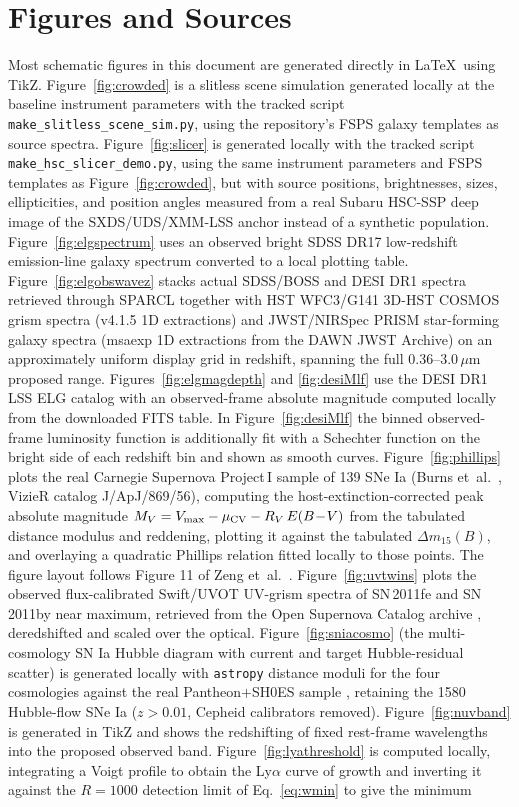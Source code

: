 \documentclass[10pt,onecolumn]{article}
\begin{document}
\section*{Figures and Sources}
Most schematic figures in this document are generated directly in \LaTeX\ using TikZ. Figure~\ref{fig:crowded} is a slitless scene simulation generated locally at the baseline instrument parameters with the tracked script \texttt{make\_slitless\_scene\_sim.py}, using the repository's FSPS galaxy templates as source spectra. Figure~\ref{fig:slicer} is generated locally with the tracked script \texttt{make\_hsc\_slicer\_demo.py}, using the same instrument parameters and FSPS templates as Figure~\ref{fig:crowded}, but with source positions, brightnesses, sizes, ellipticities, and position angles measured from a real Subaru HSC-SSP deep image of the SXDS/UDS/XMM-LSS anchor \cite{aihara2018} instead of a synthetic population. Figure~\ref{fig:elgspectrum} uses an observed bright SDSS DR17 low-redshift emission-line galaxy spectrum converted to a local plotting table. Figure~\ref{fig:elgobswavez} stacks actual SDSS/BOSS and DESI DR1 spectra retrieved through SPARCL together with HST WFC3/G141 3D-HST COSMOS grism spectra (v4.1.5 1D extractions) and JWST/NIRSpec PRISM star-forming galaxy spectra (msaexp 1D extractions from the DAWN JWST Archive) on an approximately uniform display grid in redshift, spanning the full $0.36$--$3.0\,\mu$m proposed range. Figures~\ref{fig:elgmagdepth} and \ref{fig:desiMlf} use the DESI DR1 LSS ELG catalog with an observed-frame absolute magnitude computed locally from the downloaded FITS table. In Figure~\ref{fig:desiMlf} the binned observed-frame luminosity function is additionally fit with a Schechter function on the bright side of each redshift bin and shown as smooth curves. Figure~\ref{fig:phillips} plots the real Carnegie Supernova Project\,I sample of 139 SNe Ia (Burns et~al.\ \cite{burns2018csp}, VizieR catalog J/ApJ/869/56), computing the host-extinction-corrected peak absolute magnitude $M_V=V_{\max}-\mu_{\rm CV}-R_V\,E(B\!-\!V)$ from the tabulated distance modulus and reddening, plotting it against the tabulated $\Delta m_{15}(B)$, and overlaying a quadratic Phillips relation fitted locally to those points. The figure layout follows Figure 11 of Zeng et~al.\ \cite{zeng2025sn2023ehl}. Figure~\ref{fig:uvtwins} plots the observed flux-calibrated Swift/UVOT UV-grism spectra of SN\,2011fe and SN\,2011by near maximum, retrieved from the Open Supernova Catalog archive \cite{guillochon2017}, deredshifted and scaled over the optical. Figure~\ref{fig:sniacosmo} (the multi-cosmology SN Ia Hubble diagram with current and target Hubble-residual scatter) is generated locally with \texttt{astropy} distance moduli for the four cosmologies against the real Pantheon$+$SH0ES sample \cite{brout2022}, retaining the 1580 Hubble-flow SNe Ia ($z>0.01$, Cepheid calibrators removed). Figure~\ref{fig:nuvband} is generated in TikZ and shows the redshifting of fixed rest-frame wavelengths into the proposed observed band. Figure~\ref{fig:lyathreshold} is computed locally, integrating a Voigt profile to obtain the Ly$\alpha$ curve of growth and inverting it against the $R=1000$ detection limit of Eq.~\eqref{eq:wmin} to give the minimum 
\end{document}
